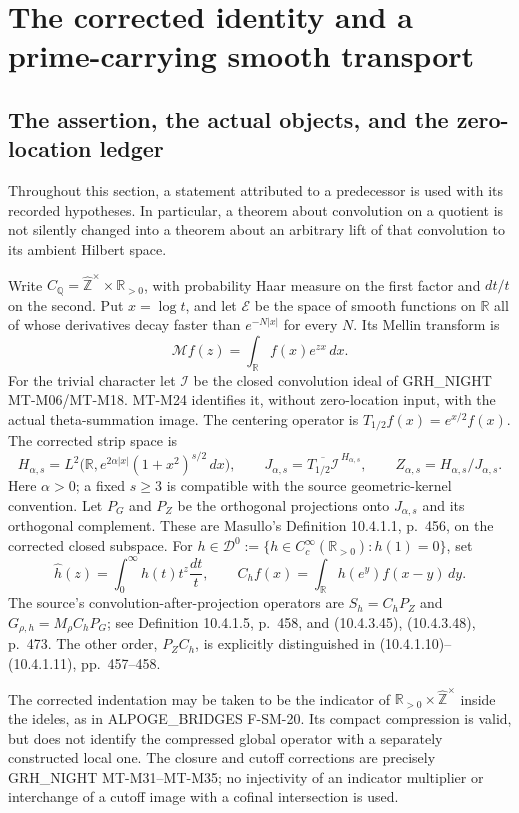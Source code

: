\section{The corrected identity and a prime-carrying smooth transport}
\label{sec:trace-global}

\subsection{The assertion, the actual objects, and the zero-location ledger}

Throughout this section, a statement attributed to a predecessor is used
with its recorded hypotheses. In particular, a theorem about convolution
on a quotient is not silently changed into a theorem about an arbitrary
lift of that convolution to its ambient Hilbert space.

Write $C_{\mathbb Q}=\widehat{\mathbb Z}^{\times}\times\mathbb R_{>0}$,
with probability Haar measure on the first factor and $dt/t$ on the
second. Put $x=\log t$, and let $\mathcal E$ be the space of smooth
functions on $\mathbb R$ all of whose derivatives decay faster than
$e^{-N|x|}$ for every $N$. Its Mellin transform is
\[
 \mathcal Mf(z)=\int_{\mathbb R}f(x)e^{zx}\,dx.
\]
For the trivial character let $\mathcal I$ be the closed convolution
ideal of GRH\_NIGHT MT-M06/MT-M18. MT-M24 identifies it, without
zero-location input, with the actual theta-summation image. The
centering operator is $T_{1/2}f(x)=e^{x/2}f(x)$. The corrected strip
space is
\[
 H_{\alpha,s}=L^2\bigl(\mathbb R,
      e^{2\alpha|x|}(1+x^2)^{s/2}\,dx\bigr),\qquad
 J_{\alpha,s}=\overline{T_{1/2}\mathcal I}^{\,H_{\alpha,s}},
 \qquad Z_{\alpha,s}=H_{\alpha,s}/J_{\alpha,s}.
 \tag{MA-TR-1}
\]
Here $\alpha>0$; a fixed $s\ge3$ is compatible with the source
geometric-kernel convention. Let $P_G$ and $P_Z$ be the orthogonal
projections onto $J_{\alpha,s}$ and its orthogonal complement. These
are Masullo's Definition 10.4.1.1, p.~456, on the corrected closed
subspace. For $h\in\mathcal D^0:=\{h\in C_c^\infty(\mathbb R_{>0}):
h(1)=0\}$, set
\[
 \widehat h(z)=\int_0^\infty h(t)t^z\frac{dt}{t},\qquad
 C_hf(x)=\int_{\mathbb R}h(e^y)f(x-y)\,dy.
\]
The source's convolution-after-projection operators are
$S_h=C_hP_Z$ and $G_{\rho,h}=M_\rho C_hP_G$; see Definition
10.4.1.5, p.~458, and (10.4.3.45), (10.4.3.48), p.~473.
The other order, $P_ZC_h$, is explicitly distinguished in
(10.4.1.10)--(10.4.1.11), pp.~457--458.

The corrected indentation may be taken to be the indicator of
$\mathbb R_{>0}\times\widehat{\mathbb Z}^{\times}$ inside the ideles,
as in ALPOGE\_BRIDGES F-SM-20. Its compact compression is valid, but
does not identify the compressed global operator with a separately
constructed local one. The closure and cutoff corrections are precisely
GRH\_NIGHT MT-M31--MT-M35; no injectivity of an indicator multiplier
or interchange of a cutoff image with a cofinal intersection is used.

